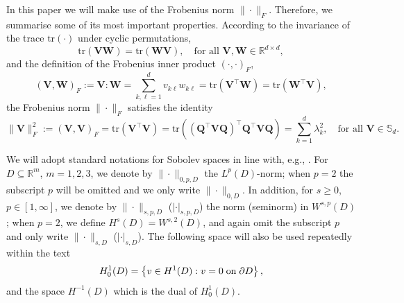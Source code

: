 \documentclass[final,12pt]{amsart}
\theoremstyle{plain}
\theoremstyle{definition}
\begin{document}
In this paper we will make use of the Frobenius norm \( \|\cdot\|_F \). Therefore, we summarise some of its most important properties. According to the invariance of the trace \(\text{tr}(\cdot)\) under cyclic permutations,
\[
\text{tr}(\mathbf{V}\mathbf{W}) = \text{tr}(\mathbf{W}\mathbf{V}), \quad \text{for all } \mathbf{V}, \mathbf{W} \in \mathbb{R}^{d \times d},
\]
and the definition of the Frobenius inner product \((\cdot, \cdot)_F\),
\begin{equation}
(\mathbf{V}, \mathbf{W})_F := \mathbf{V} : \mathbf{W} = \sum_{k,\ell=1}^d v_{k\ell}w_{k\ell} = \text{tr}(\mathbf{V}^\top \mathbf{W}) = \text{tr}(\mathbf{W}^\top \mathbf{V}), \label{Ferobino}
\end{equation}
the Frobenius norm \( \|\cdot\|_F \)  satisfies the identity
\begin{equation}
\|\mathbf{V}\|_F^2 := (\mathbf{V}, \mathbf{V})_F = \text{tr}(\mathbf{V}^\top \mathbf{V}) = \text{tr}((\mathbf{Q}^\top \mathbf{V}\mathbf{Q})^\top \mathbf{Q}^\top \mathbf{V}\mathbf{Q}) = \sum_{k=1}^d \lambda_k^2, \quad \text{for all } \mathbf{V} \in \mathbb{S}_d. \label{2.1}
\end{equation}


We will adopt standard notations for Sobolev spaces  in line with,
e.g., \cite{EG21-I}. For $D\subseteq\mathbb{R}^{m}$, $m=1,2,3$, we denote by
$\|\cdot\|_{0,p,D} $ the $L^{p}(D)$-norm; when $p=2$ the subscript $p$
will be omitted and we only write $\|\cdot\|_{0,D} $. In addition, for
$s\geq 0$, $p\in [1,\infty]$, we denote by $\| \cdot \|_{s,p,D}$ ($|
\cdot |_{s,p,D}$) the norm (seminorm) in $W^{s,p}(D)$; when $p=2$, we
define $H^{s}(D)=W^{s,2}(D)$, and again omit the subscript $p$ and only write $\|\cdot \|_{s,D}$
($| \cdot |_{s,D}$).  The following space will also be used repeatedly within the text
\begin{equation}
	H^{1}_{0}(D)=\left\{ v \in H^1(D) : v = 0 \;  {\rm on} \;  \partial D \right\}, \label{space}
\end{equation}
and the space $H^{-1}(D)$ which is the dual of $H^{1}_{0}(D)$. 
\end{document}
